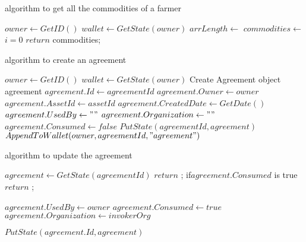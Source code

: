 \documentclass[11pt]{article}
\begin{document}

\begin{algorithm}[hbt!]
\caption{algorithm to get all the commodities of a farmer}\label{alg:three}
$owner \gets GetID()$
$wallet \gets GetState(owner)$
$arrLength \gets $\;
$commodities \gets $\;
$i = 0$\;
        $return$ commodities;
\end{algorithm}


\begin{algorithm}[hbt!]
\caption{algorithm to create an agreement}\label{alg:three}
$owner \gets GetID()$
$wallet \gets GetState(owner)$
Create Agreement object agreement\;
$agreement.Id \gets agreementId$\;
$agreement.Owner \gets owner$\;
$agreement.AssetId \gets assetId$\;
$agreement.CreatedDate \gets GetDate()$\;
$agreement.UsedBy \gets "" $\;
$agreement.Organization \gets "" $\;
$agreement.Consumed \gets false $\;
$PutState(agreementId, agreement)$\;
$AppendToWallet(owner,agreementId,"agreement")$\;
\end{algorithm}


\begin{algorithm}[hbt!]
\caption{algorithm to update the agreement}\label{alg:two}
$agreement \gets GetState(agreementId)$ 
{
    $return$ ;
}{if{$agreement.Consumed$ is true}{
    $return$ ;
}}

$agreement.UsedBy \gets owner$\;
$agreement.Consumed \gets true$\;
$agreement.Organization \gets invokerOrg$\;

$PutState(agreement.Id, agreement)$
\end{algorithm}
\end{document}
